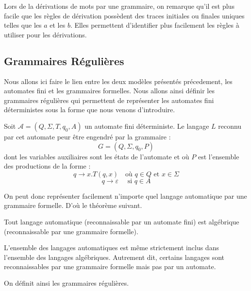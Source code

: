\begin{remark}
    Lors de la dérivations de mots par une grammaire, on remarque qu'il est plus facile que les règles de dérivation 
    possèdent des traces initiales ou finales uniques telles que les $a$ et les $b$. 
    Elles permettent d'identifier plus facilement les règles à utiliser pour les dérivations. 
\end{remark}



\subsection{Grammaires Régulières}

Nous allons ici faire le lien entre les deux modèles présentés précedement, les automates fini et les grammaires formelles. 
Nous allons ainsi définir les grammaires régulières qui permettent de représenter les automates fini déterministes sous 
la forme que nous venons d'introduire. 

\begin{prop}
    Soit $ \mathcal{A} = (Q, \Sigma, T, q_0, A)$ un automate fini déterministe. 
    Le langage $L$ reconnu par cet automate peur être engendré par la grammaire : 
        \[ G = (Q, \Sigma, q_0, P) \] 
    dont les variables auxiliaires sont les états de l'automate et où $P$ est l'ensemble 
    des productions de la forme :
        \[ q \longrightarrow x. T(q,x) \quad \text{où } q \in Q \text{ et } x \in \Sigma \] 
        \[ q \longrightarrow \varepsilon \quad \text{ si } q \in A \] 
\end{prop}

On peut donc représenter facilement n'importe quel langage automatique par une grammaire formelle. 
D'où le théorème suivant. 

\begin{theorem}
    Tout langage automatique (reconnaissable par un automate fini) est algébrique (reconnaissable par une grammaire formelle). 
    
    \vspace{0.2cm}

    L'ensemble des langages automatiques est même strictement inclus dans l'ensemble des langages algébriques. 
    Autrement dit, certains langages sont reconnaissables par une grammaire formelle mais pas par un automate. 
\end{theorem}

On définit ainsi les grammaires régulières. 

